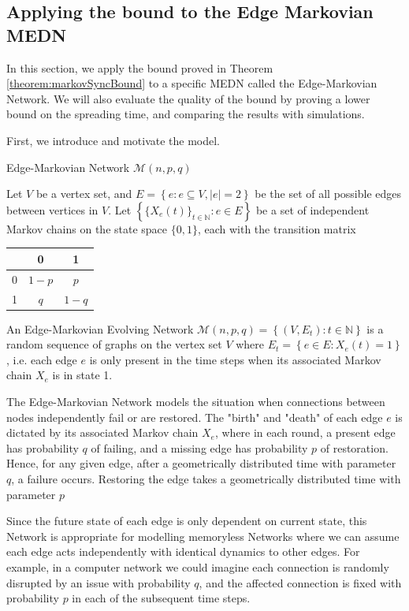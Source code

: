 \subsection{Applying the bound to the Edge Markovian MEDN}\label{subsect:floodingBoundEdgeMarkovian}

In this section, we apply the bound proved in Theorem \ref{theorem:markovSyncBound} to a specific MEDN called the Edge-Markovian Network. We will also evaluate the quality of the bound by proving a lower bound on the spreading time, and comparing the results with simulations. 

First, we introduce and motivate the model.
\begin{definition}
	Edge-Markovian Network $\mathcal{M}(n, p, q)$

	\noindent
	Let $V$ be a vertex set, and $E = \left\{e : e \subseteq V, |e| = 2 \right\}$ be the set of all possible edges between vertices in $V$. 
	Let $\left\{\{X_e(t)\}_{t \in \mathbb{N}} : e \in E \right\}$ be a set of independent Markov chains on the state space $\{0,1\}$, each with the transition matrix
	\begin{center}
		\begin{tabular}{ c | c c }
		   & 0     & 1 \\ 
		\hline
		 0 & $1 - p$ & $p$ \\  
		 1 & $q$     & $1 - q$  
		\end{tabular}
	\end{center}
	An Edge-Markovian Evolving Network $\mathcal{M}(n, p, q) = \left\{(V, E_t) : t \in \mathbb{N} \right\}$ is a random sequence of graphs on the vertex set $V$ where $E_t = \left\{ e \in E : X_e(t) = 1 \right\}$, i.e. each edge $e$ is only present in the time steps when its associated Markov chain $X_e$ is in state 1.
\end{definition}
The Edge-Markovian Network models the situation when connections between nodes independently fail or are restored. The "birth" and "death" of each edge $e$ is dictated by its associated Markov chain $X_e$, where in each round, a present edge has probability $q$ of failing, and a missing edge has probability $p$ of restoration. Hence, for any given edge, after a geometrically distributed time with parameter $q$, a failure occurs. Restoring the edge takes a geometrically distributed time with parameter $p$ %

Since the future state of each edge is only dependent on current state, this Network is appropriate for modelling memoryless Networks where we can assume each edge acts independently with identical dynamics to other edges. For example, in a computer network we could imagine each  connection is randomly disrupted by an issue with probability $q$, and the affected connection is fixed with probability $p$ in each of the subsequent time steps. 

